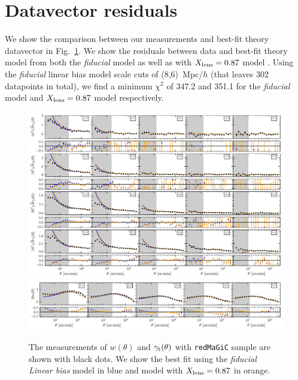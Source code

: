 \documentclass[aps, prd,twocolumn,superscriptaddress,nofootinbib,preprintnumbers]{revtex4-1}
\newcommand{\gammat}{\ensuremath{\gamma_{\rm t}(\theta)}}
\newcommand{\wtheta}{\ensuremath{w(\theta)}}
\newcommand{\redmagic}{\texttt{redMaGiC} }
\newcommand{\IR}[1]{{\color{red}[\textbf{Note for IR}: #1]}}
\begin{document}
\section{Datavector residuals}
We show the comparison between our measurements and best-fit theory datavector in Fig.~\ref{fig:data_2pt}. We show the residuals between data and best-fit theory model from both the \textit{fiducial} model as well as with $X_{\rm lens}=0.87$ model . Using the \textit{fiducial} linear bias model scale cuts of (8,6)~Mpc/$h$ (that leaves 302 datapoints in total), we find a minimum $\chi^2$ of 347.2 and 351.1 for the \textit{fiducial} model and $X_{\rm lens}=0.87$ model respectively. 

\begin{figure}
\includegraphics[width=\textwidth]{figs/gt_wx_data.pdf}
\includegraphics[width=\textwidth]{figs/wt_wx_data.pdf}
\caption[]{The measurements of $\wtheta$ and $\gammat$ with \redmagic sample are shown with black dots. We show the best fit using the \textit{fiducial} \textit{Linear bias} model in blue and model with $X_{\rm lens}=0.87$ in orange.  }
\label{fig:data_2pt}
\end{figure}
\end{document}
